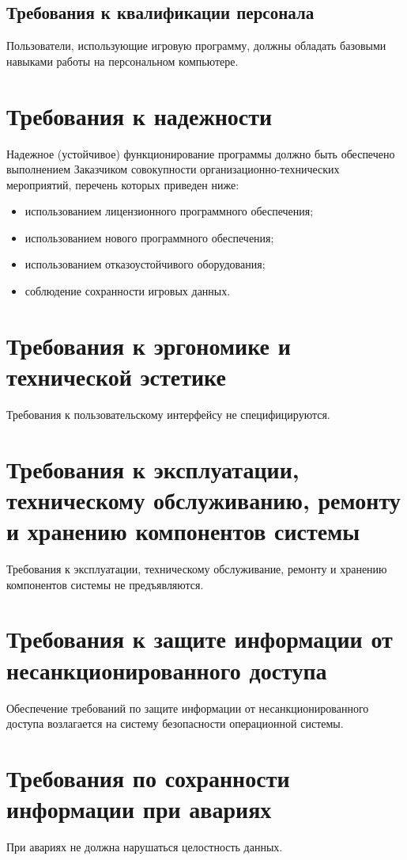 \subsection{Требования к квалификации персонала}
Пользователи, использующие игровую программу, должны обладать базовыми навыками работы на 
персональном компьютере.

\section{Требования к надежности}
Надежное (устойчивое) функционирование программы должно быть обеспечено выполнением 
Заказчиком совокупности организационно-технических мероприятий, перечень которых приведен 
ниже: 
\begin{itemize}
    \item использованием лицензионного программного обеспечения; 
    \item использованием нового программного обеспечения;
    \item использованием отказоустойчивого оборудования;
    \item соблюдение сохранности игровых данных.
\end{itemize}

\section{Требования к эргономике и технической эстетике}
Требования к пользовательскому интерфейсу не специфицируются.

\section{Требования к эксплуатации, техническому обслуживанию, ремонту и хранению компонентов 
    системы}
Требования к эксплуатации, техническому обслуживание, ремонту и хранению компонентов системы 
не предъявляются.

\section{Требования к защите информации от несанкционированного доступа}
Обеспечение требований по защите информации от несанкционированного доступа возлагается на 
систему безопасности операционной системы.

\section{Требования по сохранности информации при авариях}
При авариях не должна нарушаться целостность данных. 

